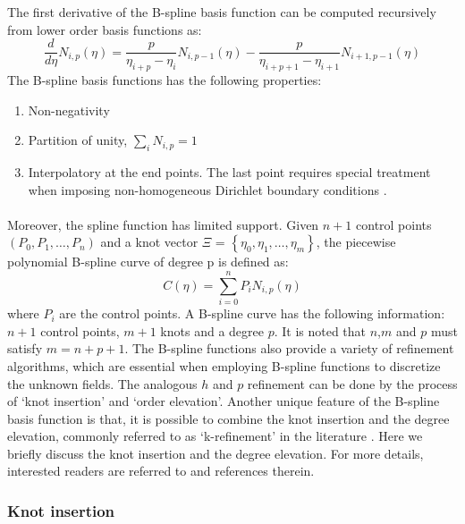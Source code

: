 %
The first derivative of the B-spline basis function can be computed recursively from lower order basis functions as:
\begin{equation}
    \frac{d}{d\eta} N_{i,p}(\eta) =
        \frac{p}{\eta_{i+p} - \eta_i} N_{i,p-1}(\eta) -
        \frac{p}{\eta_{i+p+1} - \eta_{i+1}} N_{i+1,p-1}(\eta)
\end{equation}
%
The B-spline basis functions has the following properties:
\begin{enumerate}
    \item Non-negativity
    \item Partition of unity, $\sum_i N_{i,p}=1$
    \item Interpolatory at the end points. The last point requires special treatment when imposing non-homogeneous Dirichlet boundary conditions \citep{NGUYEN201589}.
\end{enumerate}


\paragraph{}
Moreover, the spline function has limited support.
Given $n + 1$ control points $(P_0 ,P_1,\dots,P_n )$ and a knot vector 
    $\Xi$ = $\left\{
        \eta_0 ,\eta_1 ,\dots,\eta_m 
    \right\}$, the piecewise polynomial B-spline curve of degree p is defined as:
\begin{equation}
    C(\eta) = \sum_{i=0}^n P_i N_{i,p} (\eta)
\end{equation}
%
where $P_i$ are the control points.
A B-spline curve has the following information: $n+1$ control points, $m+1$ knots and a degree $p$.
It is noted that $n$,$m$ and $p$ must satisfy $m = n + p + 1$.
The B-spline functions also provide a variety of refinement algorithms, which are essential when employing B-spline functions to discretize the unknown fields.
The analogous $h$ and $p$ refinement can be done by the process of `knot insertion' and `order elevation'.
Another unique feature of the B-spline basis function is that, it is possible to combine the knot insertion and the degree elevation, commonly referred to as ‘k-refinement’ in the literature \citep{Hug2005b}.
Here we briefly discuss the knot insertion and the degree elevation.
For more details, interested readers are referred to \citep{Pie1997,Hug2005b} and references therein.


\subsubsection{Knot insertion}
\label{lr_sec:nurbs_knot_ins}
